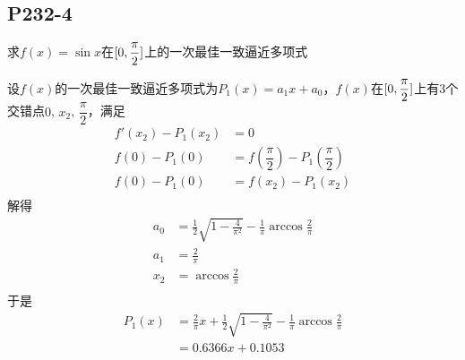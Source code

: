 \subsection{P232-4}
\renewcommand{\FX}{\sin x}
\renewcommand{\LRANGE}{0}
\renewcommand{\RRANGE}{\dfrac{\pi}{2}}
求$f(x) = \sin{x}$在$\RANGE$上的一次最佳一致逼近多项式
\begin{SOLVE}
设$f(x)$的一次最佳一致逼近多项式为$P_1(x) = a_1 x + a_0$，$f(x)$在$\RANGE$上有3个交错点$\LRANGE$, $x_2$, $\RRANGE$，满足
\begin{align*}
f'(x_2) - P_1(x_2)        & = 0 \\
f(\LRANGE) - P_1(\LRANGE) & = f(\RRANGE) - P_1(\RRANGE) \\
f(\LRANGE) - P_1(\LRANGE) & = f(x_2) - P_1(x_2) \\
\end{align*}
解得
\begin{align*}
a_0    & = \frac{1}{2} \sqrt{1-\frac{4}{\pi^2}} - \frac{1}{\pi} \arccos{\frac{2}{\pi}} \\
a_1    & = \frac{2}{\pi} \\
x_2    & = \arccos{\frac{2}{\pi}} \\
\end{align*}
于是
\begin{align*}
P_1(x) & = \frac{2}{\pi} x + \frac{1}{2} \sqrt{1-\frac{4}{\pi^2}} - \frac{1}{\pi} \arccos{\frac{2}{\pi}} \\
       & = 0.6366 x + 0.1053 \\
\end{align*}
\end{SOLVE}